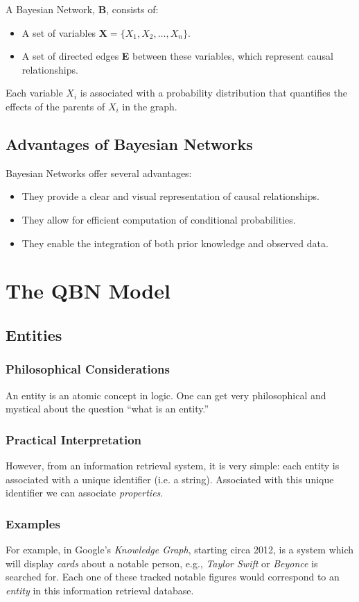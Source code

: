 \documentclass[12pt]{article}
\begin{document}
A Bayesian Network, \textbf{B}, consists of:

\begin{itemize}
    \item A set of variables $\textbf{X} = \{X_1, X_2, \ldots, X_n\}$.
    \item A set of directed edges \textbf{E} between these variables, which represent causal relationships.
\end{itemize}

Each variable \(X_i\) is associated with a probability distribution that quantifies the effects of the parents of \(X_i\) in the graph.

\subsection{Advantages of Bayesian Networks}

Bayesian Networks offer several advantages:

\begin{itemize}
    \item They provide a clear and visual representation of causal relationships.
    \item They allow for efficient computation of conditional probabilities.
    \item They enable the integration of both prior knowledge and observed data.
\end{itemize}
\section{The QBN Model}
\subsection{Entities}
\subsubsection{Philosophical Considerations}
An entity is an atomic concept in logic.
One can get very philosophical and mystical about the question ``what is an entity.''
\subsubsection{Practical Interpretation}
However, from an information retrieval system, it is very simple: each entity is associated with a unique identifier (i.e. a string).
Associated with this unique identifier we can associate {\em properties}.
\subsubsection{Examples}
For example, in Google's {\em Knowledge Graph}, starting circa 2012, is a system which will display {\em cards} about a notable person, e.g., {\em Taylor Swift} or {\em Beyonce} is searched for.
Each one of these tracked notable figures would correspond to an {\em entity} in this information retrieval database.
\end{document}

